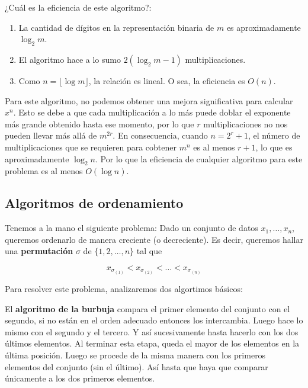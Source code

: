 \begin{pre} ¿Cuál es la eficiencia de este algoritmo?: \end{pre}

\begin{enumerate}
    \item La cantidad de dígitos en la representación binaria de $m$ es aproximadamente $\log_2 m$.
    \item El algoritmo hace a lo sumo $2(\log_2 m-1)$ multiplicaciones.
    \item Como $n = \lfloor \log m \rfloor$, la relación es lineal. O sea, la eficiencia es $O(n)$.
\end{enumerate}

Para este algoritmo, no podemos obtener una mejora significativa para calcular $x^n$. Esto se debe a que cada multiplicación a lo más puede doblar el exponente más grande obtenido hasta ese momento, por lo que $r$ multiplicaciones no nos pueden llevar más allá de $m^{2r}$. En consecuencia, cuando $n = 2^r+1$, el número de multiplicaciones que se requieren para cobtener $m^n$ es al menos $r+1$, lo que es aproximadamente $\log_2 n$. Por lo que la eficiencia de cualquier algoritmo para este problema es al menos $O(\log n)$.

\subsection{Algoritmos de ordenamiento}

Tenemos a la mano el siguiente problema: Dado un conjunto de datos $x_1, \dots, x_n$, queremos ordenarlo de manera creciente (o decreciente). Es decir, queremos hallar una \textbf{permutación} $\sigma$ de $\{1, 2, \dots, n\}$ tal que

\[
x_{\sigma_{(1)}} < x_{\sigma_{(2)}} < \dots < x_{\sigma_{(n)}}
\]

Para resolver este problema, analizaremos dos algortimos básicos:

El \textbf{algoritmo de la burbuja} compara el primer elemento del conjunto con el segundo, si no están en el orden adecuado entonces los intercambia. Luego hace lo mismo con el segundo y el tercero. Y así sucesivamente hasta hacerlo con los dos últimos elementos. Al terminar esta etapa, queda el mayor de los elementos en la última posición. Luego se procede de la misma manera con los primeros elementos del conjunto (sin el último). Así hasta que haya que comparar únicamente a los dos primeros elementos.

